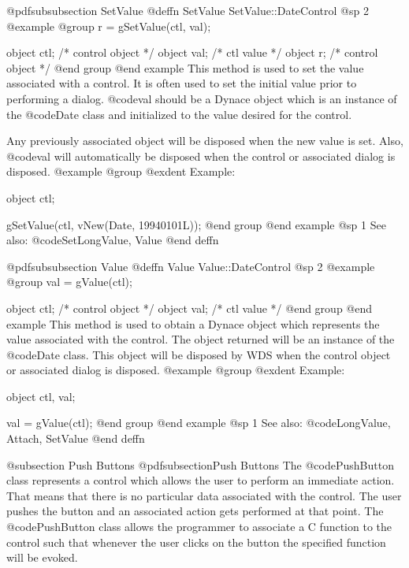 @pdfsubsubsection {SetValue}
@deffn {SetValue} SetValue::DateControl
@sp 2
@example
@group
r = gSetValue(ctl, val);

object  ctl;    /*  control object  */
object  val;    /*  ctl value       */
object  r;      /*  control object  */
@end group
@end example
This method is used to set the value associated with a control.  It is
often used to set the initial value prior to performing a dialog.
@code{val} should be a Dynace object which is an instance of the
@code{Date} class and initialized to the value desired for the control.

Any previously associated object will be disposed when the new value is set.
Also, @code{val} will automatically be disposed when the control or associated
dialog is disposed.
@example
@group
@exdent Example:

object  ctl;

gSetValue(ctl, vNew(Date, 19940101L));
@end group
@end example
@sp 1
See also:  @code{SetLongValue, Value}
@end deffn














@pdfsubsubsection {Value}
@deffn {Value} Value::DateControl
@sp 2
@example
@group
val = gValue(ctl);

object  ctl;   /*  control object  */
object  val;   /*  ctl value       */
@end group
@end example
This method is used to obtain a Dynace object which represents the value
associated with the control.  The object returned will be an instance of
the @code{Date} class.  This object will be disposed by WDS when the
control object or associated dialog is disposed.
@example
@group
@exdent Example:

object  ctl, val;

val = gValue(ctl);
@end group
@end example
@sp 1
See also:  @code{LongValue, Attach, SetValue}
@end deffn

















@subsection Push Buttons
@pdfsubsection{Push Buttons}
The @code{PushButton} class represents a control which allows the user
to perform an immediate action.  That means that there is no particular
data associated with the control.  The user pushes the button and an
associated action gets performed at that point.  The @code{PushButton}
class allows the programmer to associate a C function to the control
such that whenever the user clicks on the button the specified function
will be evoked.


